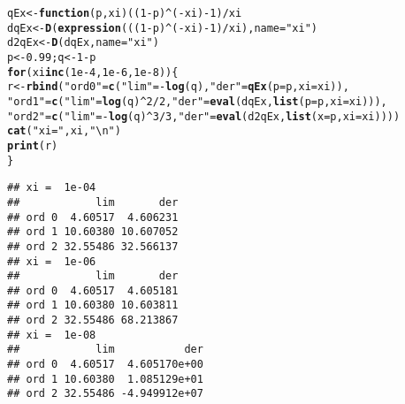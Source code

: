 \documentclass[11pt]{article}\usepackage[]{graphicx}\usepackage[]{xcolor}
\makeatletter
\newcommand{\hlnum}[1]{\textcolor[rgb]{0.686,0.059,0.569}{#1}}%
\newcommand{\hlstr}[1]{\textcolor[rgb]{0.192,0.494,0.8}{#1}}%
\newcommand{\hlopt}[1]{\textcolor[rgb]{0,0,0}{#1}}%
\newcommand{\hlstd}[1]{\textcolor[rgb]{0.345,0.345,0.345}{#1}}%
\newcommand{\hlkwa}[1]{\textcolor[rgb]{0.161,0.373,0.58}{\textbf{#1}}}%
\newcommand{\hlkwb}[1]{\textcolor[rgb]{0.69,0.353,0.396}{#1}}%
\newcommand{\hlkwc}[1]{\textcolor[rgb]{0.333,0.667,0.333}{#1}}%
\newcommand{\hlkwd}[1]{\textcolor[rgb]{0.737,0.353,0.396}{\textbf{#1}}}%
\newenvironment{kframe}{%
 \def\at@end@of@kframe{}%
 \ifinner\ifhmode%
  \def\at@end@of@kframe{\end{minipage}}%
  \begin{minipage}{\columnwidth}%
 \fi\fi%
 \def\FrameCommand##1{\hskip\@totalleftmargin \hskip-\fboxsep
 \colorbox{shadecolor}{##1}\hskip-\fboxsep
     \hskip-\linewidth \hskip-\@totalleftmargin \hskip\columnwidth}%
 \MakeFramed {\advance\hsize-\width
   \@totalleftmargin\z@ \linewidth\hsize
   \@setminipage}}%
 {\par\unskip\endMakeFramed%
 \at@end@of@kframe}
\newenvironment{knitrout}{}{} %
\makeatother
\begin{document}
\begin{knitrout}\footnotesize
{}\color{fgcolor}\begin{kframe}
\begin{alltt}
\hlstd{qEx} \hlkwb{<-} \hlkwa{function}\hlstd{(}\hlkwc{p}\hlstd{,} \hlkwc{xi}\hlstd{) ((}\hlnum{1} \hlopt{-} \hlstd{p)}\hlopt{^}\hlstd{(}\hlopt{-}\hlstd{xi)} \hlopt{-} \hlnum{1}\hlstd{)} \hlopt{/} \hlstd{xi}
\hlstd{dqEx} \hlkwb{<-} \hlkwd{D}\hlstd{(}\hlkwd{expression}\hlstd{(((}\hlnum{1} \hlopt{-} \hlstd{p)}\hlopt{^}\hlstd{(}\hlopt{-}\hlstd{xi)} \hlopt{-} \hlnum{1}\hlstd{)} \hlopt{/} \hlstd{xi),} \hlkwc{name} \hlstd{=} \hlstr{"xi"}\hlstd{)}
\hlstd{d2qEx} \hlkwb{<-} \hlkwd{D}\hlstd{(dqEx,} \hlkwc{name} \hlstd{=} \hlstr{"xi"}\hlstd{)}
\hlstd{p} \hlkwb{<-} \hlnum{0.99}\hlstd{; q} \hlkwb{<-} \hlnum{1} \hlopt{-} \hlstd{p}
\hlkwa{for} \hlstd{(xi} \hlkwa{in} \hlkwd{c}\hlstd{(}\hlnum{1e-4}\hlstd{,} \hlnum{1e-6}\hlstd{,} \hlnum{1e-8}\hlstd{)) \{}
    \hlstd{r} \hlkwb{<-} \hlkwd{rbind}\hlstd{(}\hlstr{"ord 0"} \hlstd{=} \hlkwd{c}\hlstd{(}\hlstr{"lim"} \hlstd{=} \hlopt{-}\hlkwd{log}\hlstd{(q),} \hlstr{"der"} \hlstd{=} \hlkwd{qEx}\hlstd{(}\hlkwc{p} \hlstd{= p,} \hlkwc{xi} \hlstd{= xi)),}
               \hlstr{"ord 1"} \hlstd{=} \hlkwd{c}\hlstd{(}\hlstr{"lim"} \hlstd{=} \hlkwd{log}\hlstd{(q)}\hlopt{^}\hlnum{2} \hlopt{/} \hlnum{2}\hlstd{,} \hlstr{"der"} \hlstd{=} \hlkwd{eval}\hlstd{(dqEx,} \hlkwd{list}\hlstd{(}\hlkwc{p} \hlstd{= p,} \hlkwc{xi} \hlstd{= xi))),}
               \hlstr{"ord 2"} \hlstd{=} \hlkwd{c}\hlstd{(}\hlstr{"lim"} \hlstd{=} \hlopt{-}\hlkwd{log}\hlstd{(q)}\hlopt{^}\hlnum{3} \hlopt{/} \hlnum{3}\hlstd{,} \hlstr{"der"} \hlstd{=} \hlkwd{eval}\hlstd{(d2qEx,} \hlkwd{list}\hlstd{(}\hlkwc{x} \hlstd{= p,} \hlkwc{xi} \hlstd{= xi))))}
    \hlkwd{cat}\hlstd{(}\hlstr{"xi = "}\hlstd{, xi,} \hlstr{"\textbackslash{}n"}\hlstd{)}
    \hlkwd{print}\hlstd{(r)}
\hlstd{\}}
\end{alltt}
\begin{verbatim}
## xi =  1e-04 
##            lim       der
## ord 0  4.60517  4.606231
## ord 1 10.60380 10.607052
## ord 2 32.55486 32.566137
## xi =  1e-06 
##            lim       der
## ord 0  4.60517  4.605181
## ord 1 10.60380 10.603811
## ord 2 32.55486 68.213867
## xi =  1e-08 
##            lim           der
## ord 0  4.60517  4.605170e+00
## ord 1 10.60380  1.085129e+01
## ord 2 32.55486 -4.949912e+07
\end{verbatim}
\end{kframe}
\end{knitrout}
\end{document}
